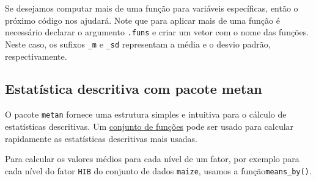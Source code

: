 \documentclass[
]{book}
\newenvironment{Shaded}{\begin{snugshade}}{\end{snugshade}}
\newcommand{\CommentTok}[1]{\textcolor[rgb]{0.56,0.35,0.01}{\textit{#1}}}
\newcommand{\DataTypeTok}[1]{\textcolor[rgb]{0.13,0.29,0.53}{#1}}
\newcommand{\KeywordTok}[1]{\textcolor[rgb]{0.13,0.29,0.53}{\textbf{#1}}}
\newcommand{\NormalTok}[1]{#1}
\newcommand{\OperatorTok}[1]{\textcolor[rgb]{0.81,0.36,0.00}{\textbf{#1}}}
\newcommand{\StringTok}[1]{\textcolor[rgb]{0.31,0.60,0.02}{#1}}
\begin{document}
Se desejamos computar mais de uma função para variáveis específicas, então o próximo código nos ajudará. Note que para aplicar mais de uma função é necessário declarar o argumento \texttt{.funs} e criar um vetor com o nome das funções. Neste caso, os sufixos \texttt{\_m} e \texttt{\_sd} representam a média e o desvio padrão, respectivamente.

\begin{Shaded}
\end{Shaded}

\hypertarget{dstat}{%
\subsection{Estatística descritiva com pacote metan}\label{dstat}}

O pacote \texttt{metan} fornece uma estrutura simples e intuitiva para o cálculo de estatísticas descritivas. Um \href{https://tiagoolivoto.github.io/metan/reference/utils_stats.html}{conjunto de funções} pode ser usado para calcular rapidamente as estatísticas descritivas mais usadas.

Para calcular os valores médios para cada nível de um fator, por exemplo para cada nível do fator \texttt{HIB} do conjunto de dados \texttt{maize}, usamos a função\texttt{means\_by()}.
\end{document}
